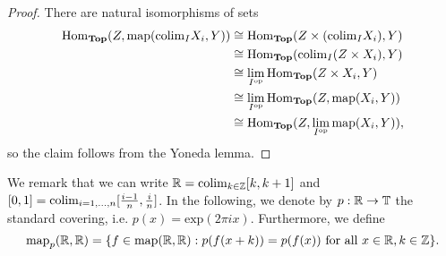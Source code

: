 \begin{proof}
There are natural isomorphisms of sets
\begin{align*}
\mathrm{Hom}_{\mathbf{Top}}(Z,\mathrm{map}(\mathrm{colim}_I X_i, Y)) 
&\cong \mathrm{Hom}_{\mathbf{Top}}(Z\times (\mathrm{colim}_I X_i), Y) \\
&\cong \mathrm{Hom}_{\mathbf{Top}}(\mathrm{colim}_I (Z\times X_i), Y)\\
&\cong \lim_{I^{\mathrm{op}}}\mathrm{Hom}_{\mathbf{Top}}(Z\times X_i, Y)\\
&\cong \lim_{I^{\mathrm{op}}}\mathrm{Hom}_{\mathbf{Top}}(Z,\mathrm{map}(X_i, Y))\\
&\cong \mathrm{Hom}_{\mathbf{Top}}(Z, \lim_{I^{\mathrm{op}}} \mathrm{map}(X_i, Y)),
\end{align*}
so the claim follows from the Yoneda lemma.
%
\end{proof}

We remark that we can write $\mathbb{R} = \mathrm{colim}_{k\in \mathbb{Z}} [k, k+1]$
and $[0,1] = \mathrm{colim}_{i=1,\ldots, n} [\frac{i-1}{n}, \frac in]$. 
In the following, we denote by $p:\mathbb{R}\to \mathbb{T}$  the 
standard covering, i.e. $p(x) = \mathrm{exp}(2\pi i x)$. Furthermore,
we define
\[
\mathrm{map}_p(\mathbb{R},\mathbb{R}) = \{f\in \mathrm{map}(\mathbb{R}, \mathbb{R}): p(f(x+k)) = p(f(x)) \text{ for all }
x\in \mathbb{R}, k\in \mathbb{Z}\}.
\]

